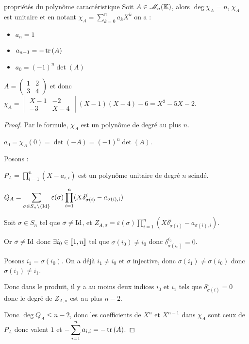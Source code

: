 \begin{theoreme}{propriétés du polynôme caractéristique}{}
    Soit $A \in \mathscr M_n (\mathbb{K})$, alors $\deg \chi_A = n$, $\chi_A$ est unitaire et en notant $\displaystyle \chi_A = \sum_{k = 0 }^{n } a_kX^k$ on a : 

    \begin{itemize}
        \item $a_n = 1$
        \item $a_{n - 1} = - \operatorname{tr} \,(A)$
        \item $a_0 = (-1)^n \det(A)$
    \end{itemize}
\end{theoreme}

\begin{exemple}
    $A = \begin{pmatrix}
        1 & 2 \\
        3 & 4
    \end{pmatrix}$ et donc $\chi_A = \begin{vmatrix}
        X - 1 & -2 \\
        -3 & X - 4
    \end{vmatrix} (X - 1)(X - 4) - 6 = X^2 - 5X - 2$.
\end{exemple}


\begin{proof}
    Par le formule, $\chi_A$ est un polynôme de degré au plus $n$.

    $a_0 = \chi_A(0) = \det(-A) = (-1)^n \det(A)$.

    \avspace Posons : 
    
    $\displaystyle P_A = \prod_{i = 1 }^{ n } (X - a_{i, i})$ est un polynôme unitaire de degré $n$ scindé.

    $\displaystyle Q_A = \sum_{\sigma \in S_n \setminus \{\operatorname{Id}\}} \varepsilon(\sigma) \prod_{i = 1 }^{ n } (X \delta_{\sigma(i)}^i - a_{\sigma(i), i})$ 

    Soit $\sigma \in S_n$ tel que $\sigma \neq \operatorname{Id}$, et 
    $\displaystyle Z_{A, \sigma} = \varepsilon(\sigma) \prod_{i = 1 }^{ n } (X \delta_{\sigma(i)}^i - a_{\sigma(i), i})$.

    Or $\sigma \neq \operatorname{Id}$ donc $\exists i_0 \in [\![1, n]\!]$ tel que $\sigma(i_0) \neq i_0$ donc $\delta_{\sigma(i_0)}^{i_0} = 0$.

    Posons $i_1 = \sigma(i_0)$. On a déjà $i_1 \neq i_0$ et $\sigma$ injective, donc $\sigma(i_1) \neq \sigma(i_0)$
    donc $\sigma(i_1) \neq i_1$. 

    Donc dans le produit, il y a au moins deux indices $i_0$ et $i_1$ tels que 
    $\delta_{\sigma(i)}^i = 0$ donc le degré de $Z_{A, \sigma}$ est au plus $n - 2$.

    Donc $\deg Q_A \leqslant n - 2$, donc les coefficients de $X^n$ et $X^{n - 1}$ dans $\chi_A$ 
    sont ceux de $P_A$ donc valent $1$ et $\displaystyle - \sum_{i = 1 }^{n } a_{i, i} = - \operatorname{tr} \,(A)$.
\end{proof}

